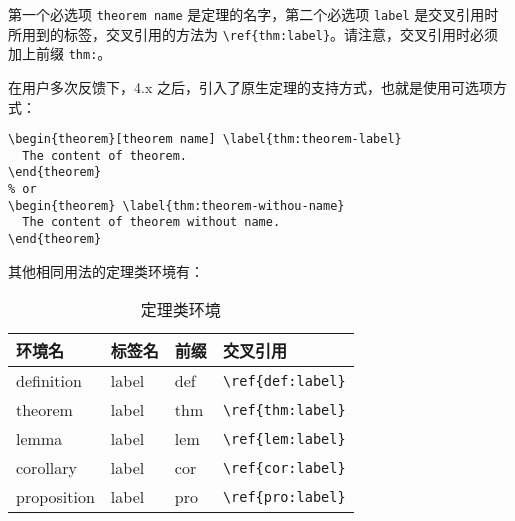 \documentclass[lang=cn,10pt]{elegantbook}
\begin{document}
第一个必选项 \lstinline{theorem name} 是定理的名字，第二个必选项 \lstinline{label} 是交叉引用时所用到的标签，交叉引用的方法为 \verb|\ref{thm:label}|。请注意，交叉引用时必须加上前缀 \lstinline{thm:}。

在用户多次反馈下，4.x 之后，引入了原生定理的支持方式，也就是使用可选项方式：

\begin{lstlisting}
\begin{theorem}[theorem name] \label{thm:theorem-label}
  The content of theorem.
\end{theorem}
% or 
\begin{theorem} \label{thm:theorem-withou-name}
  The content of theorem without name.
\end{theorem}
\end{lstlisting}

其他相同用法的定理类环境有：

\begin{table}[htbp]
   \centering
   \caption{定理类环境}
     \begin{tabular}{llll}
     \toprule
     环境名 & 标签名 & 前缀 & 交叉引用 \\
     \midrule
     definition & label & def   & \lstinline|\ref{def:label}| \\
     theorem & label & thm   & \lstinline|\ref{thm:label}| \\
     lemma & label & lem   & \lstinline|\ref{lem:label}| \\
     corollary & label & cor   & \lstinline|\ref{cor:label}| \\
     proposition & label & pro   & \lstinline|\ref{pro:label}| \\
     \bottomrule
     \end{tabular}%
   \label{tab:theorem-class}%
 \end{table}%
 
\end{document}
